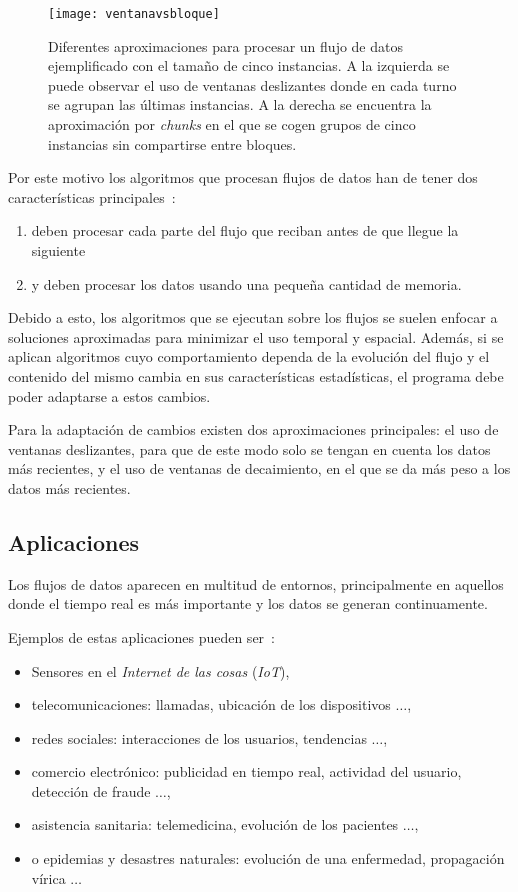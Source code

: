 \begin{figure}[H]
	\centering
	\texttt{[image: ventanavsbloque]}
	\caption{Diferentes aproximaciones para procesar un flujo de datos ejemplificado con el tamaño de cinco instancias. A la izquierda se puede observar el uso de ventanas deslizantes donde en cada turno se agrupan las últimas instancias. A la derecha se encuentra la aproximación por \textit{chunks} en el que se cogen grupos de cinco instancias sin compartirse entre bloques.}
	\label{fig:window}
\end{figure}


Por este motivo los algoritmos que procesan flujos de datos han de tener dos características principales~\cite{bifet2018machine}:

\begin{enumerate}
	\item deben procesar cada parte del flujo que reciban antes de que llegue la siguiente
	\item y deben procesar los datos usando una pequeña cantidad de memoria.
\end{enumerate}

Debido a esto, los algoritmos que se ejecutan sobre los flujos se suelen enfocar a soluciones aproximadas para minimizar el uso temporal y espacial. Además, si se aplican algoritmos cuyo comportamiento dependa de la evolución del flujo y el contenido del mismo cambia en sus características estadísticas, el programa debe poder adaptarse a estos cambios.

Para la adaptación de cambios existen dos aproximaciones principales: el uso de ventanas deslizantes, para que de este modo solo se tengan en cuenta los datos más recientes, y el uso de ventanas de decaimiento, en el que se da más peso a los datos más recientes. 

\subsection{Aplicaciones}

Los flujos de datos aparecen en multitud de entornos, principalmente en aquellos donde el tiempo real es más importante y los datos se generan continuamente.

Ejemplos de estas aplicaciones pueden ser~\cite{rodriguez2020flujos}:
\begin{itemize}
	\item Sensores en el \textit{Internet de las cosas} (\textit{IoT}),
	\item telecomunicaciones: llamadas, ubicación de los dispositivos $\ldots$,
	\item redes sociales: interacciones de los usuarios, tendencias $\ldots$,
	\item comercio electrónico: publicidad en tiempo real, actividad del usuario, detección de fraude $\ldots$,
	\item asistencia sanitaria: telemedicina, evolución de los pacientes $\ldots$,
	\item o epidemias y desastres naturales: evolución de una enfermedad, propagación vírica $\ldots$
\end{itemize}




